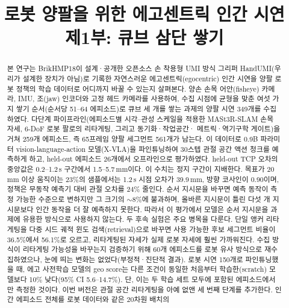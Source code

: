 \documentclass[conference,10pt]{IEEEtran}
\newcommand{\mm}{\,mm\xspace}
\begin{document}
\title{로봇 양팔을 위한 에고센트릭 인간 시연\\제1부: 큐브 삼단 쌓기}
\author{
}
\maketitle

\begin{abstract}
본 연구는 BrikHMP18이 설계·공개한 오픈소스 손 착용형 UMI 방식 그리퍼 HandUMI(우리가 설계한 장치가 아님)로 기록한 자연스러운 에고센트릭(egocentric) 인간 시연을 양팔 로봇 정책의 학습
데이터로 어디까지 바꿀 수 있는지 살펴본다. 양손 손목 어안(fisheye) 카메라, IMU, 조(jaw) 인코더와 고정 헤드 카메라를 사용하여,
수집 시점에 균형을 맞춘 여섯 가지 쌓기 순서(순서당 51--64 에피소드)로 큐브 세 개를 쌓는 과제의 양팔 시연 349개를 수집하였다.
다단계 파이프라인(에피소드별 시각--관성 스케일을 적용한 MASt3R-SLAM 손목 자세, 6-DoF 로봇 팔로의 리타게팅, 그리고 동기화·작업공간·
메트릭·역기구학 게이트)을 거쳐 259개 에피소드, 즉 65프레임 양팔 세그먼트 561개가 남는다. 이 데이터로 0.9B 파라미터
vision-language-action 모델(X-VLA)을 파인튜닝하여 30스텝 관절 공간 액션 청크를 예측하게 하고, held-out 에피소드 26개에서
오프라인으로 평가하였다. held-out TCP 오차의 중앙값은 0.2--1.2\,s 구간에서 1.5--5.7\mm{}이다. 이 수치는 정지 구간이 지배한다.
목표가 20\mm 이상 움직이는 23\%의 샘플에서는 1.2\,s 시점 오차가 39.9\mm, 방향 코사인이 0.90이며, 정책은 무동작 예측기 대비 관절
오차를 24\% 줄인다. 순서 지시문을 바꾸면 예측 동작이 측정 가능한 수준으로 변하지만 그 크기의 ${\sim}8\%$에 불과하며, 올바른
지시문이 틀린 다섯 개 지시문보다 인간 동작을 더 잘 예측하지 못한다. 따라서 이 평가에서 모델은 순서 지시문을 과제에 유용한
방식으로 사용하지 않는다.
두 후속 실험은 주요 병목을 다룬다. 단일 앵커 리타게팅을 다중 시드 궤적 윈도 검색(retrieval)으로 바꾸면 사용 가능한 후보 세그먼트
비율이 36.5\%에서 56.1\%로 오르고, 리타게팅된 자세가 실제 로봇 자세에 훨씬 가까워진다. 수집 방식이 리타게팅 가능성을 바꾸는지
검증하기 위해 60개 에피소드를 로봇 유사 방식으로 재수집하였으나, 눈에 띄는 변화는 없었다(부정적·진단적 결과). 로봇 시연 150개로
파인튜닝했을 때, 에고 사전학습 모델의 geo score는 다른 조건이 동일한 처음부터 학습한(scratch) 모델보다 10\% 낮다(95\% CI 5.6--14.7\%).
단, 이는 두 학습 세트 모두에 포함된 에피소드에서만 측정한 것이다.
이번 버전은 관절 공간 리타게팅을 아예 없앤 세 번째 단계를 추가한다. 인간 에피소드 전체를 로봇 데이터와 같은 20차원 배치의

\end{abstract}
\end{document}
